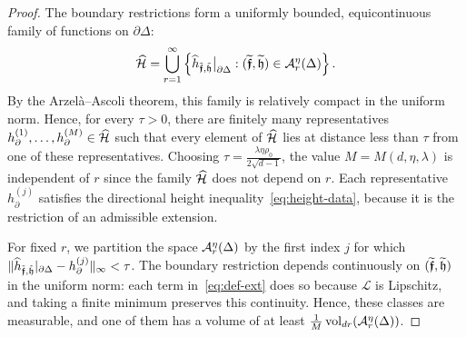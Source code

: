 \documentclass[11pt,letterpaper]{article}
\begin{document}
\begin{proof}
      The boundary restrictions form a uniformly bounded, equicontinuous family of functions on $\partial\Delta$:
      \[
            \widehat{\mathcal H}=\bigcup_{r=1}^{\infty}\left\{\widehat h_{\tilde{\bm{\mathfrak f}},\tilde{\mathfrak h}}\big|_{\partial\Delta}:(\widetilde{\bm{\mathfrak f}},\widetilde{\mathfrak h})\in\mathcal A_r^\eta(\Delta)\right\}.
      \]
      By the Arzel\`a--Ascoli theorem, this family is relatively compact in the uniform norm. Hence, for every $\tau>0$, there are finitely many representatives $h_\partial^{(1)},\ldots,h_\partial^{(M)}\in \widehat{\mathcal H}$ such that every element of $\widehat{\mathcal H}$ lies at distance less than $\tau$ from one of these representatives. Choosing $\tau=\frac{\lambda\eta\rho_0}{2\sqrt{d-1}}$, the value $M=M(d,\eta,\lambda)$ is independent of $r$ since the family $\widehat{\mathcal H}$ does not depend on $r$. Each representative $h_\partial^{(j)}$ satisfies the directional height inequality~\eqref{eq:height-data}, because it is the restriction of an admissible extension.

      For fixed $r$, we partition the space $\mathcal A_{r}^{\eta}(\Delta)$ by the first index $j$ for which $\|\widehat h_{\tilde{\bm{\mathfrak f}},\tilde{\mathfrak h}}|_{\partial\Delta}-h_\partial^{(j)}\|_\infty<\tau$. The boundary restriction depends continuously on $(\widetilde{\bm{\mathfrak f}},\widetilde{\mathfrak h})$ in the uniform norm: each term in~\eqref{eq:def-ext} does so because $\mathcal L$ is Lipschitz, and taking a finite minimum preserves this continuity. Hence,
      these classes are measurable, and one of them has a volume of at least $\frac1M \operatorname{vol}_{dr}(\mathcal A_{r}^{\eta}(\Delta))$.


\end{proof}
\end{document}
